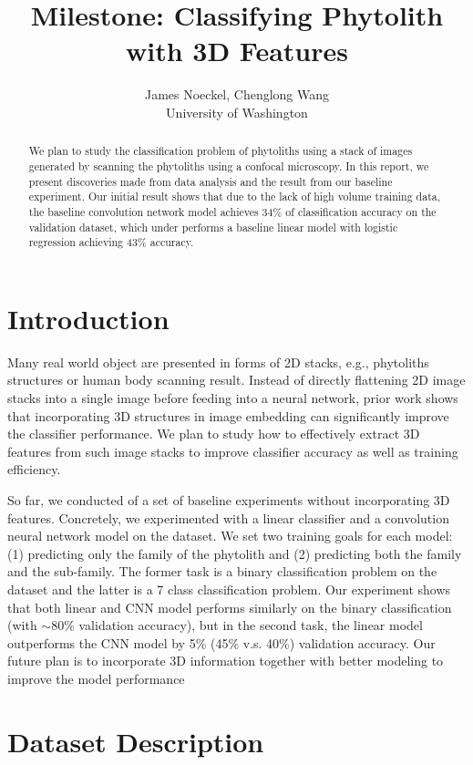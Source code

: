 \documentclass{article}
\title{Milestone: Classifying Phytolith with 3D Features}
\author{
  James Noeckel, Chenglong Wang\\
  University of Washington
}
\begin{document}

\maketitle

\begin{abstract}
  We plan to study the classification problem of phytoliths using a stack of images generated by scanning the phytoliths using a confocal microscopy. In this report, we present discoveries made from data analysis and the result from our baseline experiment. Our initial result shows that due to the lack of high volume training data, the baseline convolution network model achieves 34\% of classification accuracy on the validation dataset, which under performs a baseline linear model with logistic regression achieving 43\% accuracy.
\end{abstract}

\section{Introduction}

Many real world object are presented in forms of 2D stacks, e.g., phytoliths structures or human body scanning result. Instead of directly flattening 2D image stacks into a single image before feeding into a neural network, prior work shows that incorporating 3D structures in image embedding can significantly improve the classifier performance. We plan to study how to effectively extract 3D features from such image stacks to improve classifier accuracy as well as training efficiency.

So far, we conducted of a set of baseline experiments without incorporating 3D features. Concretely, we experimented with a linear classifier and a convolution neural network model on the dataset. We set two training goals for each model: (1) predicting only the family of the phytolith and (2) predicting both the family and the sub-family. The former task is a binary classification problem on the dataset and the latter is a 7 class classification problem. Our experiment shows that both linear and CNN model performs similarly on the binary classification (with $\sim$80\% validation accuracy), but in the second task, the linear model outperforms the CNN model by 5\% (45\% v.s. 40\%) validation accuracy. Our future plan is to incorporate 3D information together with better modeling to improve the model performance

\section{Dataset Description}
\end{document}
